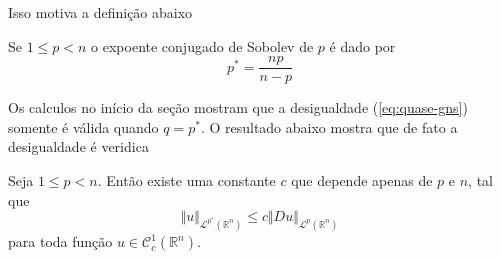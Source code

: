 \documentclass[a4paper, 11pt]{book}
\theoremstyle{definition}
\newcommand{\bR}{\mathbb{R}}
\newcommand{\cC}{\mathcal{C}}
\newcommand{\cL}{\mathcal{L}}
\begin{document}
Isso motiva a definição abaixo
\begin{dbox}
    Se $1 \leqslant p < n$ o expoente conjugado de Sobolev de $p$ é dado por
    \[
        p^* = \frac{np}{n - p}
    \]
\end{dbox}

Os calculos no início da seção mostram que a desigualdade (\ref{eq:quase-gns}) somente é válida quando $q = p^*$. O resultado abaixo mostra que de fato a desigualdade é veridica

\begin{tbox} Seja $1 \leqslant p < n$. Então existe uma constante $c$ que depende apenas de $p$ e $n$, tal que
\begin{equation}
    \Vert u \Vert_{\cL^{p^*}(\bR^n)} \leqslant c \Vert Du \Vert_{\cL^p(\bR^n)}
\end{equation}
para toda função $u \in \cC^1_c(\bR^n)$.
\end{tbox}
\end{document}
